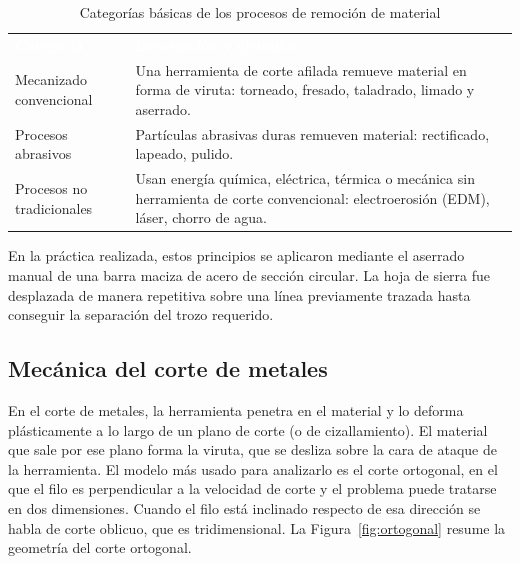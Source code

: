 \documentclass[12pt,a4paper]{article}
\newcommand{\encab}[1]{\textcolor{white}{\sffamily\bfseries #1}}
\begin{document}
\begin{table}[!htb]
	\centering
	\caption{Categorías básicas de los procesos de remoción de
		material}\label{tab:categorias}
	\small
	\begin{tabularx}{\linewidth}{l X}
		\rowcolor{darkblue}
		\encab{Categoría}       & \encab{Descripción y ejemplos}
		\\
		Mecanizado convencional & Una herramienta de corte afilada remueve material
		en forma de viruta:
		torneado, fresado, taladrado, limado y aserrado.
		\\
		Procesos abrasivos      & Partículas abrasivas duras remueven material:
		rectificado, lapeado,
		pulido.
		\\
		Procesos no tradicionales
		                        & Usan energía química, eléctrica, térmica o
		mecánica sin herramienta
		de corte convencional: electroerosión (EDM), láser, chorro de agua.
		\\
	\end{tabularx}
\end{table}

\vspace{2pt}

En la práctica realizada, estos principios se aplicaron mediante el aserrado
manual de una barra maciza de acero de sección circular. La hoja de sierra fue
desplazada de manera repetitiva sobre una línea previamente trazada hasta
conseguir la separación del trozo requerido.

\subsection{Mecánica del corte de metales}

En el corte de metales, la herramienta penetra en el material y lo deforma
plásticamente a lo largo de un plano de corte (o de cizallamiento). El
material que sale por ese plano forma la viruta, que se desliza sobre la cara de
ataque de la herramienta. El modelo más usado para analizarlo es el
corte ortogonal, en el que el filo es perpendicular a la velocidad de
corte y el problema puede tratarse en dos dimensiones. Cuando el filo está
inclinado respecto de esa dirección se habla de corte oblicuo, que es
tridimensional. La Figura~\ref{fig:ortogonal} resume la geometría del corte
ortogonal.

\vspace{6pt}
\end{document}
